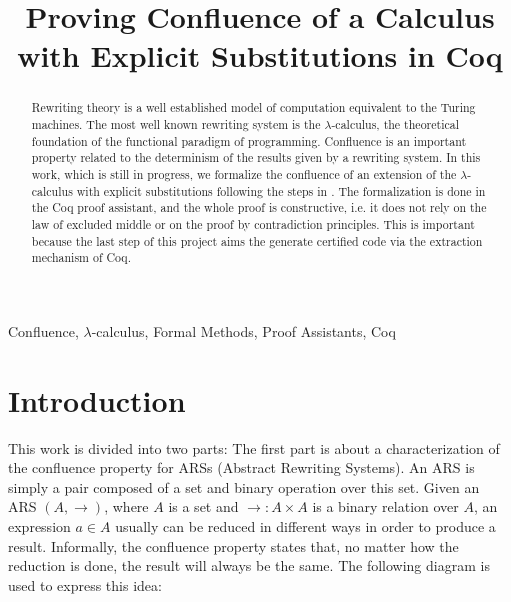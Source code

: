 \documentclass[conference]{IEEEtran}
\begin{document}
\title{Proving Confluence of a Calculus with Explicit Substitutions in Coq}

\author{
\and
{}
}

\maketitle

\begin{abstract}
  Rewriting theory is a well established model of computation
  equivalent to the Turing machines. The most well known rewriting
  system is the $\lambda$-calculus, the theoretical foundation of the
  functional paradigm of programming. Confluence is an important
  property related to the determinism of the results given by a
  rewriting system. In this work, which is still in progress, we
  formalize the confluence of an extension of the $\lambda$-calculus
  with explicit substitutions following the steps in \cite{kes09}. The
  formalization is done in the Coq proof assistant, and the whole
  proof is constructive, i.e. it does not rely on the law of excluded
  middle or on the proof by contradiction principles. This is
  important because the last step of this project aims the generate
  certified code via the extraction mechanism of Coq.
\end{abstract}

\begin{IEEEkeywords}
Confluence, $\lambda$-calculus, Formal Methods, Proof Assistants, Coq
\end{IEEEkeywords}

\section{Introduction}

This work is divided into two parts: The first part is about a
characterization of the confluence property for ARSs (Abstract
Rewriting Systems). An ARS is simply a pair composed of a set and
binary operation over this set. Given an ARS $(A,\to)$, where $A$ is a
set and $\to:A\times A$ is a binary relation over $A$, an expression
$a\in A$ usually can be reduced in different ways in order to produce
a result. Informally, the confluence property states that, no matter
how the reduction is done, the result will always be the same. The
following diagram is used to express this idea:
\end{document}
